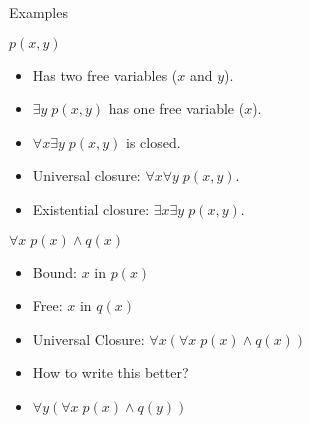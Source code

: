 \begin{wideslide}[bm=,toc=]{Examples}
\begin{ex}{7.13}
$p(x,y)$
\end{ex}
\vspace*{-2ex}
\begin{itemize}
\item<2-> Has two free variables ($x$ and $y$).
\item<3-> $\exists y\; p(x,y)$ has one free variable \pause[3] ($x$).
\item<5-> $\forall x \exists y \;p(x,y)$ is closed.
\item<6-> Universal closure: \pause[3] $\forall x \forall y \;p(x,y)$.
\item<8-> Existential closure: \pause[2] $\exists x \exists y \;p(x,y)$.
\end{itemize}
\pause
\begin{ex}{7.14}
$\forall x \; p(x) \land q(x)$
\end{ex}
\vspace*{-2ex}
\begin{itemize}
\item<11-> Bound: \pause[2] $x$ in $p(x)$
\item<13-> Free: \pause[2] $x$ in $q(x)$
\item<15-> Universal Closure: \pause[2] $\forall x(\forall x \; p(x) \land q(x))$
\item<17-> How to write this better?
\item<18-> $\forall y(\forall x \; p(x) \land q(y))$
\end{itemize}
\end{wideslide}
